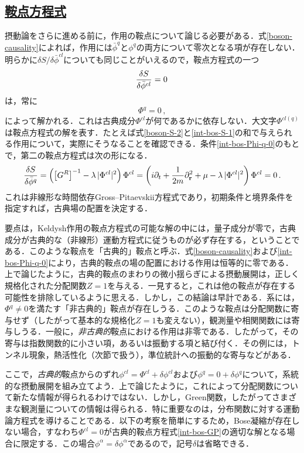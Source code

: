 \documentclass[a4paper,11pt]{ltjsarticle}
\newcommand{\subsectionlink}[1]{\subsection[#1]{\hyperlink{toc}{#1}}}
\begin{document}
\subsectionlink{鞍点方程式}\label{sec_int_bos-2}


摂動論をさらに進める前に，作用の鞍点について論じる必要がある．式\eqref{boson-causality}によれば，作用には$\bar\phi^{q}$と$\phi^{q}$の両方について零次となる項が存在しない．明らかに$\delta S/ \delta \bar\phi^{cl}$についても同じことがいえるので，鞍点方程式の一つ
\begin{equation}
{\delta S\over \delta \bar\phi^{cl} } = 0\,
\end{equation}は，常に
\begin{equation}\label{int-bos-Phi-q-0}
\Phi^{q}=0 \, ,
\end{equation}によって解かれる．これは古典成分$\Phi^{cl}$が何であるかに依存しない．大文字$\Phi^{cl(q)}$は鞍点方程式の解を表す．たとえば式\eqref{boson-S-2}と\eqref{int-bos-S-1}の和で与えられる作用について，実際にそうなることを確認できる．条件\eqref{int-bos-Phi-q-0}のもとで，第二の鞍点方程式は次の形になる．
\begin{equation}\label{int-bos-GP}
 {\delta S\over \delta \bar\phi^{q} }=
\left(\big[G^R\big]^{-1} - \lambda\,|\Phi^{cl}|^2\right)
\Phi^{cl}=\left(i\partial_t +
\frac{1}{2m}\partial^{2}_{\mathbf{r}}+\mu - \lambda\,
|\Phi^{cl}|^2\right)\Phi^{cl}=0 \, .
\end{equation}これは非線形な時間依存Gross--Pitaevskii方程式であり，初期条件と境界条件を指定すれば，古典場の配置を決定する．


要点は，Keldysh作用の鞍点方程式の可能な解の中には，量子成分が零で，古典成分が古典的な（非線形）運動方程式に従うものが必ず存在する，ということである．このような鞍点を「古典的」鞍点と呼ぶ．式\eqref{boson-causality}および\eqref{int-bos-Phi-q-0}により，古典的鞍点の場の配置における作用は恒等的に零である．上で論じたように，古典的鞍点のまわりの微小揺らぎによる摂動展開は，正しく規格化された分配関数$Z=1$を与える．一見すると，これは他の鞍点が存在する可能性を排除しているように思える．しかし，この結論は早計である．系には，$\Phi^{q}\neq 0$を満たす「非古典的」鞍点が存在しうる．このような鞍点は分配関数に寄与せず（したがって基本的な規格化$Z=1$も変えない），観測量や相関関数には寄与しうる．一般に，\emph{非古典的}鞍点における作用は非零である．したがって，その寄与は指数関数的に小さい項，あるいは振動する項と結び付く．その例には，トンネル現象，熱活性化（次節で扱う），準位統計への振動的な寄与などがある．


ここで，\emph{古典的}鞍点からのずれ$\phi^{cl}=\Phi^{cl}+\delta\phi^{cl}$および$\phi^q=0+\delta\phi^q$について，系統的な摂動展開を組み立てよう．上で論じたように，これによって分配関数について新たな情報が得られるわけではない．しかし，Green関数，したがってさまざまな観測量についての情報は得られる．特に重要なのは，分布関数に対する運動論方程式を導けることである．以下の考察を簡単にするため，Bose凝縮が存在しない場合，すなわち$\Phi^{cl}=0$が古典的鞍点方程式\eqref{int-bos-GP}の適切な解となる場合に限定する．この場合$\phi^\alpha =\delta\phi^\alpha$であるので，記号$\delta$は省略できる．
\end{document}

